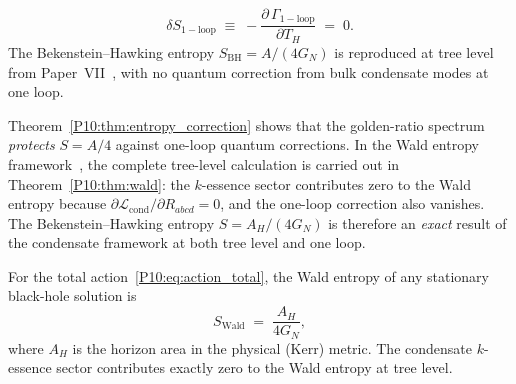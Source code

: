 \begin{theorem}
\label{P10:thm:entropy_correction}
\begin{equation}
  \boxed{\delta S_\mathrm{1-loop}
  \;\equiv\; -\frac{\partial\,\Gamma_\mathrm{1-loop}}{\partial T_H}
  \;=\; 0}.
  \label{P10:eq:delta_S_zero}
\end{equation}
The Bekenstein--Hawking entropy $S_\mathrm{BH} = A/(4G_N)$
is reproduced at tree level from Paper~VII~\cite{Paper7},
with no quantum correction from bulk condensate modes at one loop.
\end{theorem}

\begin{remark}
\label{P10:rem:entropy_protected}
Theorem~\ref{P10:thm:entropy_correction} shows that the golden-ratio
spectrum \emph{protects} $S = A/4$ against one-loop quantum corrections.
In the Wald entropy framework~\cite{Wald1993}, the complete tree-level
calculation is carried out in Theorem~\ref{P10:thm:wald}:
the $k$-essence sector contributes zero to the Wald entropy because
$\partial\mathcal{L}_\mathrm{cond}/\partial R_{abcd}=0$, and the
one-loop correction also vanishes.
The Bekenstein--Hawking entropy $S = A_H/(4G_N)$ is therefore
an \emph{exact} result of the condensate framework at both tree level
and one loop.
\end{remark}

\begin{theorem}
\label{P10:thm:wald}
For the total action~\eqref{P10:eq:action_total}, the Wald entropy of any
stationary black-hole solution is
\begin{equation}
  \boxed{S_\mathrm{Wald}
  \;=\; \frac{A_H}{4G_N}},
  \label{P10:eq:wald_result}
\end{equation}
where $A_H$ is the horizon area in the physical (Kerr) metric.
The condensate $k$-essence sector contributes exactly zero to the
Wald entropy at tree level.
\end{theorem}

